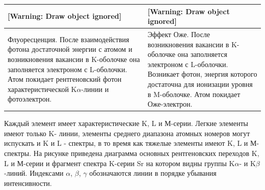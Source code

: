 \documentclass[a4paper,14pt, openany, twoside, draft]{extbook} %
\begin{document}
\begin{flushleft}
\tablefirsthead{}
\tablehead{}
\tabletail{}
\tablelasttail{}
\begin{supertabular}{|m{6.866cm}|m{8.0130005cm}|}
\hline
{ [Warning: Draw object ignored]} &
{ [Warning: Draw object ignored]}\\\hline
{ Флуоресценция. После взаимодействия фотона достаточной энергии с атомом и возникновения вакансии в K{}-оболочке она заполняется электроном с L{}-оболочки. Атом покидает рентгеновский фотон характеристической K${\alpha}${}-линии и фотоэлектрон.} &
{ Эффект Оже. После возникновения вакансии в K{}-оболочке она заполняется электроном с L{}-оболочки. Возникает фотон, энергия которого достаточна для ионизации уровня в M{}-оболочке. Атом покидает Оже-электрон.}\\\hline
\end{supertabular}
\end{flushleft}
Каждый элемент имеет характеристические K, L и М-серии. Легкие элементы имеют только K- линии, элементы среднего  диапазона атомных номеров могут испускать и K и L - спектры, в то время как тяжелые элементы имеют K, L и М-спектры.  На рисунке приведена диаграмма основных рентгеновских переходов K, L и М-серии и фрагмент спектра K{}-серии Sr  на котором видны группы K${\alpha}${}- и K${\beta}${}-линий. Индексами ${\alpha}$, ${\beta}$, ${\gamma}$ обозначаются линии в порядке убывания интенсивности.
\end{document}
